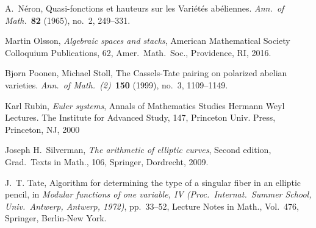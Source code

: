 \documentclass[12pt]{article}
\theoremstyle{definition}
\numberwithin{equation}{subsection}
\begin{document}
\begin{thebibliography}{HyperUser}
	A.\ N\'eron,
	Quasi-fonctions et hauteurs sur les Vari\'et\'es ab\'eliennes.
	{\em Ann.\ of Math.}\ {\bf 82} (1965), no.\ 2, 249--331.

    Martin Olsson, {\it Algebraic spaces and stacks},
    American Mathematical Society Colloquium Publications, 62, Amer.\ Math.\ Soc., Providence, RI, 2016.

    Bjorn Poonen, Michael Stoll,
    The Cassels-Tate pairing on polarized abelian varieties.
    {\em Ann.\ of Math.\ (2)}\ {\bf 150} (1999), no.\ 3, 1109--1149.

    Karl Rubin,
    {\it Euler systems},
    Annals of Mathematics Studies Hermann Weyl Lectures. The Institute for Advanced Study, 147, Princeton Univ. Press, Princeton, NJ, 2000

    Joseph H.\ Silverman,
    {\em The arithmetic of elliptic curves},
    Second edition,
    Grad.\ Texts in Math., 106,
    Springer, Dordrecht, 2009.

    J.~T. Tate, Algorithm for determining the type of a singular fiber in an elliptic pencil,
    in {\it Modular functions of one variable, IV (Proc.\ Internat.\ Summer School, Univ.\ Antwerp, Antwerp, 1972)},
    pp.\ 33--52, Lecture Notes in Math., Vol.\ 476, Springer, Berlin-New York.

\end{thebibliography}
\end{document}
